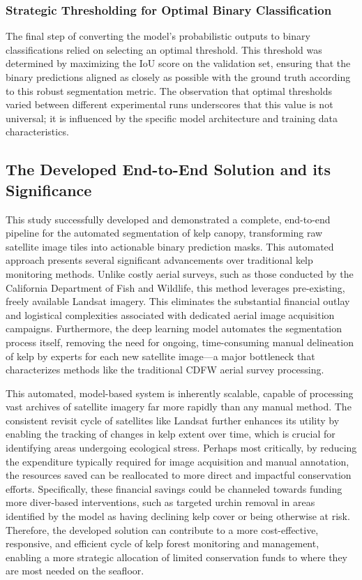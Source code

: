 \documentclass{article}
\begin{document}
\subsubsection{Strategic Thresholding for Optimal Binary Classification}

The final step of converting the model's probabilistic outputs to binary classifications relied on selecting an optimal threshold. This threshold was determined by maximizing the IoU score on the validation set, ensuring that the binary predictions aligned as closely as possible with the ground truth according to this robust segmentation metric. The observation that optimal thresholds varied between different experimental runs underscores that this value is not universal; it is influenced by the specific model architecture and training data characteristics. 

\subsection{The Developed End-to-End Solution and its Significance}

This study successfully developed and demonstrated a complete, end-to-end pipeline for the automated segmentation of kelp canopy, transforming raw satellite image tiles into actionable binary prediction masks. This automated approach presents several significant advancements over traditional kelp monitoring methods. Unlike costly aerial surveys, such as those conducted by the California Department of Fish and Wildlife, this method leverages pre-existing, freely available Landsat imagery. This eliminates the substantial financial outlay and logistical complexities associated with dedicated aerial image acquisition campaigns. Furthermore, the deep learning model automates the segmentation process itself, removing the need for ongoing, time-consuming manual delineation of kelp by experts for each new satellite image—a major bottleneck that characterizes methods like the traditional CDFW aerial survey processing. 

This automated, model-based system is inherently scalable, capable of processing vast archives of satellite imagery far more rapidly than any manual method. The consistent revisit cycle of satellites like Landsat further enhances its utility by enabling the tracking of changes in kelp extent over time, which is crucial for identifying areas undergoing ecological stress. Perhaps most critically, by reducing the expenditure typically required for image acquisition and manual annotation, the resources saved can be reallocated to more direct and impactful conservation efforts. Specifically, these financial savings could be channeled towards funding more diver-based interventions, such as targeted urchin removal in areas identified by the model as having declining kelp cover or being otherwise at risk. Therefore, the developed solution can contribute to a more cost-effective, responsive, and efficient cycle of kelp forest monitoring and management, enabling a more strategic allocation of limited conservation funds to where they are most needed on the seafloor.
\end{document}
